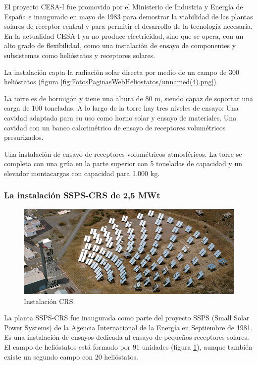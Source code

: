 El proyecto CESA-I fue promovido por el Ministerio de Industria y Energía de España e inaugurado en mayo de 1983 para demostrar la viabilidad de las plantas solares de receptor central y para permitir el desarrollo de la tecnología necesaria. En la actualidad CESA-I ya no produce electricidad, sino que se opera, con un alto grado de flexibilidad, como una instalación de ensayo de componentes y subsistemas como helióstatos y receptores solares.

La instalación capta la radiación solar directa por medio de un campo de 300 helióstatos (figura \ref{fig:FotosPaginasWebHeliostatos/unnamed(4).png}).

La torre es de hormigón y tiene una altura de 80 m, siendo capaz de soportar una carga de 100 toneladas. A lo largo de la torre hay tres niveles de ensayo:
Una cavidad adaptada para su uso como horno solar y ensayo de materiales.
Una cavidad con un banco calorimétrico de ensayo de receptores volumétricos presurizados.

Una instalación de ensayo de receptores volumétricos atmosféricos.
La torre se completa con una grúa en la parte superior con 5 toneladas de capacidad y un elevador montacargas con capacidad para 1.000 kg. \cite{PSA3WebSite}



\subsubsection{La instalación SSPS-CRS de 2,5 MWt}

\begin{figure}[h!]
  	\centering
	\includegraphics[width=\textwidth]{FotosPaginasWebHeliostatos/unnamed(6).png}
	\caption{Instalación CRS.~\cite{PSA2WebSite}
	\label{fig:FotosPaginasWebHeliostatos/unnamed(6).png}}
\end{figure}

La planta SSPS-CRS fue inaugurada como parte del proyecto SSPS (Small Solar Power Systems) de la Agencia Internacional de la Energía en Septiembre de 1981.
Es una instalación de ensayos dedicada al ensayo de pequeños receptores solares. El campo de helióstatos está formado por 91 unidades (figura \ref{fig:FotosPaginasWebHeliostatos/unnamed(6).png}), aunque también existe un segundo campo con 20 helióstatos.

